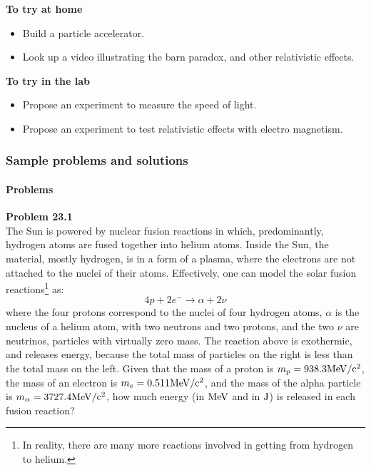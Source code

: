 \begin{framed}
\textbf{To try at home}\\
\begin{itemize}
\item Build a particle accelerator.
\item Look up a video illustrating the barn paradox, and other relativistic effects.
\end{itemize}
\end{framed}

\begin{framed}
\textbf{To try in the lab}\\
\begin{itemize}
\item Propose an experiment to measure the speed of light.
\item Propose an experiment to test relativistic effects with electro magnetism.
\end{itemize}
\end{framed}

\subsubsection{Sample problems and solutions}

\paragraph{Problems}

\begin{framed}
\textbf{Problem 23.1}\\
The Sun is powered by nuclear fusion reactions in which, predominantly, hydrogen atoms are fused together into helium atoms. Inside the Sun, the material, mostly hydrogen, is in a form of a plasma, where the electrons are not attached to the nuclei of their atoms. Effectively, one can model the solar fusion reactions\footnote{In reality, there are many more reactions involved in getting from hydrogen to helium.} as:
\begin{equation}
4p + 2e^- \to \alpha + 2\nu
\end{equation}
where the four protons correspond to the nuclei of four hydrogen atoms, $\alpha$ is the nucleus of a helium atom, with two neutrons and two protons, and the two $\nu$ are neutrinos, particles with virtually zero mass. The reaction above is exothermic, and releases energy, because the total mass of particles on the right is less than the total mass on the left. Given that the mass of a proton is $m_p=938.3 {\rm MeV/c^2}$, the mass of an electron is $m_e=0.511 {\rm MeV/c^2}$, and the mass of the alpha particle is $m_\alpha=3727.4 {\rm MeV/c^2}$, how much energy (in ${\rm MeV}$ and in ${\rm J}$) is released in each fusion reaction?
\end{framed}

